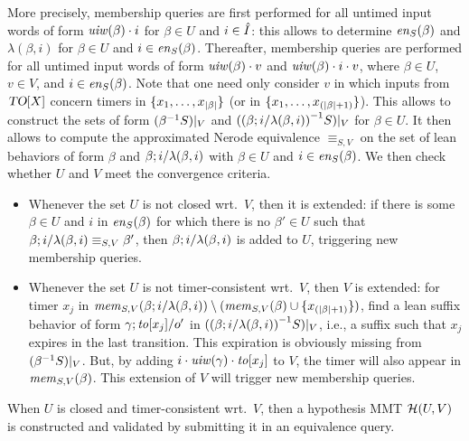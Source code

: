  More precisely,
membership queries are first performed
  for all untimed input words of form $\untimedinputword(\beta) \cdot i$
   for $\beta \in U$ and $i \in \extinputs$: this allows to determine
   $\feasibleinputs{\beta}{S}$ and $\lambda(\beta,i)$
   for $\beta \in U$ and $i \in \feasibleinputs{\beta}{S}$.
   Thereafter, membership queries are performed
  for all untimed input words of form $\untimedinputword(\beta) \cdot v$ and
  $\untimedinputword(\beta) \cdot i \cdot v$, where
  $\beta \in U$, $v \in V$, and
  $i \in \feasibleinputs{\beta}{S}$. Note that one need only consider
  $v$ in which inputs from $\toevents$ concern timers in
  $\set{x_1, \ldots, x_{|\beta|}}$ (or in  $\set{x_1, \ldots, x_{(|\beta|+1)}}$).
  This allows to construct the sets of form $\apprsuffixbehs{S}{\beta}{V}$ and
  $\apprsuffixbehs{S}{(\extend{\beta}{i}{\lambda(\beta,i)})}{V}$
  for $\beta \in U$.
  It then allows to compute the approximated Nerode equivalence $\equiv_{S,V}$ on
  the set of lean behaviors of form $\beta$ and
  $\extend{\beta}{i}{\lambda(\beta,i)}$ with
  $\beta \in U$ and $i \in \feasibleinputs{\beta}{S}$.
  We then check whether $U$ and $V$ meet the convergence criteria.
  \begin{itemize}
    \item
  Whenever the set $U$ is not closed wrt.\ $V$, then it is extended:
if there is some $\beta \in U$ and $i$ in $\feasibleinputs{\beta}{S}$
for which there is no $\beta' \in U$ such that
$\extend{\beta}{i}{\lambda(\beta,i)} \equiv_{S,V} \beta'$, 
then $\extend{\beta}{i}{\lambda(\beta,i)}$ is added to $U$,
triggering new membership queries.
\item
  Whenever the set $U$ is not timer-consistent wrt.\ $V$, then $V$ is extended:
for timer $x_j$ in
$\apprgetmemorable{S}{\extend{\beta}{i}{\lambda(\beta,i)}}{V} \setminus (\apprgetmemorable{S}{\beta}{V} \cup \set{x_{(|\beta|+1)}})$, find a lean
suffix behavior of form $\extend{\gamma}{\toevent{x_j}}{o'}$ in
$\apprsuffixbehs{S}{(\extend{\beta}{i}{\lambda(\beta,i)})}{V}$, i.e.,
a suffix such that $x_j$ expires in the last transition. This expiration is
obviously missing from $\apprsuffixbehs{S}{\beta}{V}$. But, by
adding $i\cdot\untimedinputword(\gamma)\cdot\toevent{x_j}$ to $V$, the
timer will also appear in $\apprgetmemorable{S}{\beta}{V}$.
This extension of $V$ will trigger new membership queries.
\end{itemize}
When $U$ is closed and timer-consistent wrt.\ $V$, then
a hypothesis MMT $\hypoof UV$ is constructed and
validated by submitting it in an equivalence query.
